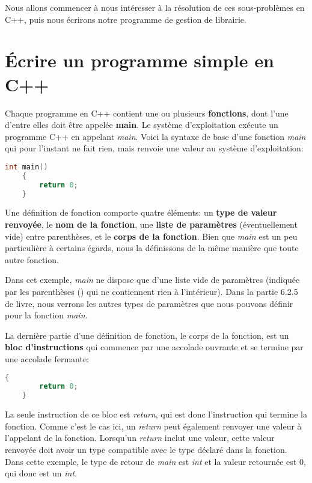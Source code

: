 \medbreak
Nous allons commencer à nous intéresser à la résolution de ces sous-problèmes en C++, puis nous écrirons notre programme de gestion de librairie.

\section{Écrire un programme simple en C++}
Chaque programme en C++ contient une ou plusieurs \textbf{fonctions}, dont l'une d'entre elles doit être appelée \textbf{main}. Le système d'exploitation exécute un programme C++ en appelant \textit{main}. Voici la syntaxe de base d'une fonction \textit{main} qui pour l'instant ne fait rien, mais renvoie une valeur au système d'exploitation:

\medbreak
\begin{lstlisting}[language=C]
	int main()
	{
		return 0;
	}
\end{lstlisting}
\medbreak

Une définition de fonction comporte quatre éléments: un \textbf{type de valeur renvoyée}, le \textbf{nom de la fonction}, une \textbf{liste de paramètres} (éventuellement vide) entre parenthèses, et le \textbf{corps de la fonction}. Bien que \textit{main} est un peu particulière à certains égards, nous la définissons de la même manière que toute autre fonction.

Dans cet exemple, \textit{main} ne dispose que d'une liste vide de paramètres (indiquée par les parenthèses () qui ne contiennent rien à l'intérieur). Dans la partie 6.2.5 de livre, nous verrons les autres types de paramètres que nous pouvons définir pour la fonction \textit{main}.

La dernière partie d'une définition de fonction, le corps de la fonction, est un \textbf{bloc d'instructions} qui commence par une accolade ouvrante et se termine par une accolade fermante:

\medbreak
\begin{lstlisting}[language=C]
	{
		return 0;
	}
\end{lstlisting}
\medbreak

La seule instruction de ce bloc est \textit{return}, qui est donc l'instruction qui termine la fonction. Comme c'est le cas ici, un \textit{return} peut également renvoyer une valeur à l'appelant de la fonction. Lorsqu'un \textit{return} inclut une valeur, cette valeur renvoyée doit avoir un type compatible avec le type déclaré dans la fonction. Dans cette exemple, le type de retour de \textit{main} est \textit{int} et la valeur retournée est 0, qui donc est un \textit{int}.

